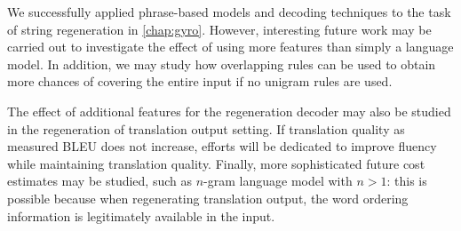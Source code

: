 We successfully applied phrase-based models and decoding
techniques to the task of string regeneration
in \autoref{chap:gyro}. However, interesting future work may
be carried out to investigate the effect of using more features
than simply a language model. In addition, we may study
how overlapping rules can be used to obtain more chances
of covering the entire input if no unigram rules are used.

The effect of additional features for the regeneration
decoder may also be studied in the regeneration of
translation output setting. If translation quality
as measured BLEU does not increase, efforts will be
dedicated to improve fluency while maintaining translation
quality. Finally, more sophisticated future cost estimates
may be studied, such as $n$-gram language model with $n > 1$: this
is possible because when regenerating translation output, the word
ordering information is legitimately available in the input.

